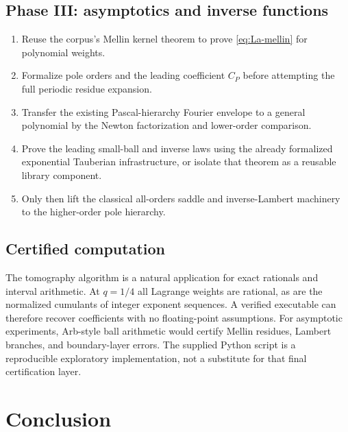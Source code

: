 \documentclass[11pt,oneside]{article}
\numberwithin{equation}{section}
\theoremstyle{definition}
\theoremstyle{remark}
\begin{document}
\subsection{Phase III: asymptotics and inverse functions}

\begin{enumerate}
\item Reuse the corpus's Mellin kernel theorem to prove \eqref{eq:La-mellin} for polynomial
      weights.
\item Formalize pole orders and the leading coefficient $C_P$ before attempting the full
      periodic residue expansion.
\item Transfer the existing Pascal-hierarchy Fourier envelope to a general polynomial by
      the Newton factorization and lower-order comparison.
\item Prove the leading small-ball and inverse laws using the already formalized exponential
      Tauberian infrastructure, or isolate that theorem as a reusable library component.
\item Only then lift the classical all-orders saddle and inverse-Lambert machinery to the
      higher-order pole hierarchy.
\end{enumerate}

\subsection{Certified computation}

The tomography algorithm is a natural application for exact rationals and interval
arithmetic.  At $q=1/4$ all Lagrange weights are rational, as are the normalized cumulants of
integer exponent sequences.  A verified executable can therefore recover coefficients with
no floating-point assumptions.  For asymptotic experiments, Arb-style ball arithmetic would
certify Mellin residues, Lambert branches, and boundary-layer errors.  The supplied Python
script is a reproducible exploratory implementation, not a substitute for that final
certification layer.


\section{Conclusion}
\label{sec:conclusion}
\end{document}
